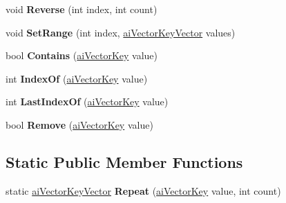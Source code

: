 \begin{DoxyCompactItemize}
\item 
\hypertarget{classai_vector_key_vector_ace5c4d1deae7a3b916a09ff60bf26c96}{void {\bfseries Reverse} (int index, int count)}\label{classai_vector_key_vector_ace5c4d1deae7a3b916a09ff60bf26c96}

\item 
\hypertarget{classai_vector_key_vector_ad7db62ad13bb9d89411f2c3d1096e13e}{void {\bfseries Set\+Range} (int index, \hyperlink{classai_vector_key_vector}{ai\+Vector\+Key\+Vector} values)}\label{classai_vector_key_vector_ad7db62ad13bb9d89411f2c3d1096e13e}

\item 
\hypertarget{classai_vector_key_vector_a95b02f06d28b7eab37215e3a865387d3}{bool {\bfseries Contains} (\hyperlink{structai_vector_key}{ai\+Vector\+Key} value)}\label{classai_vector_key_vector_a95b02f06d28b7eab37215e3a865387d3}

\item 
\hypertarget{classai_vector_key_vector_a07e54a18a03bc7007f3206757b7f2dae}{int {\bfseries Index\+Of} (\hyperlink{structai_vector_key}{ai\+Vector\+Key} value)}\label{classai_vector_key_vector_a07e54a18a03bc7007f3206757b7f2dae}

\item 
\hypertarget{classai_vector_key_vector_a5b5299da939f3845c513c9489ca0dc62}{int {\bfseries Last\+Index\+Of} (\hyperlink{structai_vector_key}{ai\+Vector\+Key} value)}\label{classai_vector_key_vector_a5b5299da939f3845c513c9489ca0dc62}

\item 
\hypertarget{classai_vector_key_vector_a7fea59a57d51ca205c5edb3b784152eb}{bool {\bfseries Remove} (\hyperlink{structai_vector_key}{ai\+Vector\+Key} value)}\label{classai_vector_key_vector_a7fea59a57d51ca205c5edb3b784152eb}

\end{DoxyCompactItemize}
\subsection*{Static Public Member Functions}
\begin{DoxyCompactItemize}
\item 
\hypertarget{classai_vector_key_vector_a41cc97301d1e6a4466715b4501d57a0d}{static \hyperlink{classai_vector_key_vector}{ai\+Vector\+Key\+Vector} {\bfseries Repeat} (\hyperlink{structai_vector_key}{ai\+Vector\+Key} value, int count)}\label{classai_vector_key_vector_a41cc97301d1e6a4466715b4501d57a0d}

\end{DoxyCompactItemize}
